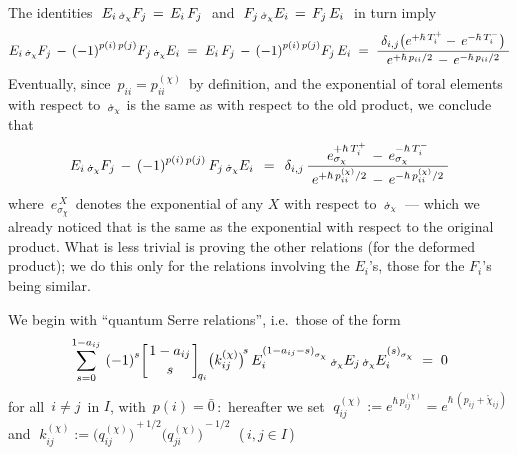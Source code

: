 \documentclass[12pt,reqno,twoside,a4paper]{amsart}
\numberwithin{equation}{section}
\theoremstyle{definition}
\newtheorem{free text}[lema]{}
\theoremstyle{remark}
\newcommand{\zero}{{\bar{0}}}
\theoremstyle{plain}
\begin{document}
                                                                   \par
   The identities  $ \; E_i \raise-1pt\hbox{$ \, \scriptstyle \dot\sigma_\chi $} F_j \, = \, E_i \, F_j \; $  and  $ \; F_j \raise-1pt\hbox{$ \, \scriptstyle \dot\sigma_\chi $} E_i \, = \, F_j \, E_i \; $  in turn imply
%
  $$  E_i\raise-1pt\hbox{$ \, \scriptstyle \dot\sigma_\chi $} F_j \, - \, {(-1)}^{p(i)\,p(j)}
  F_j \raise-1pt\hbox{$ \, \scriptstyle \dot\sigma_\chi $} E_i  \; = \;  E_i \, F_j \, - \, {(-1)}^{p(i)\,p(j)} F_j \, E_i  \; = \;  {{\; \delta_{i,j} \big( e^{+\hbar \, T_i^+} - \, e^{-\hbar \, T_i^-} \big) \;} \over {\;\; e^{+\hbar\,p_{i{}i}/2} \, - \, e^{-\hbar\,p_{i{}i}/2} \;\;}}  $$
%
 Eventually, since  $ \, p_{i{}i} = p_{i{}i}^{(\chi)} \, $  by definition,
 and the exponential of toral elements with respect to  $ \raise-1pt\hbox{$ \, \scriptstyle \dot\sigma_\chi $} $
 is the same as with respect to the old product, we conclude that
  $$  E_i \raise-1pt\hbox{$ \, \scriptstyle \dot\sigma_\chi $} F_j \, - \, {(-1)}^{p(i)\,p(j)}
  \, F_j \raise-1pt\hbox{$ \, \scriptstyle \dot\sigma_\chi $} E_i  \,\; = \;\,
 \delta_{i,j} \, {{\; e_{\sigma_\chi}^{+\hbar \, T_i^+} \, -
 \, e_{\sigma_\chi}^{-\hbar \, T_i^-} \;} \over {\; e^{+\hbar\,p_{i{}i}^{(\chi)}/2} \, - \, e^{-\hbar\,p_{i{}i}^{(\chi)}/2} \;}}  $$
%
where  $ \, e_{\sigma_\chi}^{\,X} \, $  denotes the exponential of any  $ X $  with respect to  $ \hbox{$ \, \scriptstyle \dot\sigma_\chi $} \, $   --- which we already noticed that is the same as the exponential with respect to the original product.
%
 \vskip7pt
%
   What is less trivial is proving the other relations (for the deformed product); we do this only for the relations involving the  $ E_i $'s,  those for the  $ F_i $'s  being similar.
                                                                   \par
   We begin with ``quantum Serre relations'', i.e.\ those of the form
%
  $$  \sum\limits_{s=0}^{1-a_{ij}} \, {(-1)}^s {\bigg[ {{1-a_{ij}} \atop s}  \bigg]}_{\!q_i} {\big( k_{ij}^{(\chi)} \big)}^{\!s} \, E_i^{{(1-a_{ij}-s)}_{\sigma_{\chi}}} \raise-1pt\hbox{$ \, \scriptstyle \dot\sigma_\chi $} E_j \raise-1pt\hbox{$ \, \scriptstyle \dot\sigma_\chi $} E_i^{{(s)}_{\sigma_{\chi}}}  \; = \;  0  $$
%
 for all  $ \, i \neq j \, $  in  $ I $,  with  $ \, p(i) = \zero \, $:  \,hereafter we set
%
 $ \; q_{ij}^{(\chi)} \! := e^{\hbar\, p_{ij}^{(\chi)}} \! = e^{\hbar\, (p_{ij} + \mathring{\chi}_{ij} )} \; $
%
 and
%
 $ \; k_{ij}^{(\chi)} := {\big( q_{ij}^{(\chi)} \big)}^{\!+1/2} {\big( q_{ji}^{(\chi)} \big)}^{\!-1/2} \; $  ($ \, i , j \in I \, $)
\end{document}
